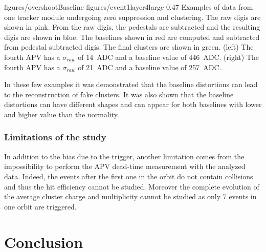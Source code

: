                  {figures/overshootBaseline} %
                 {figures/event1layer4large} %
                 {0.47}       %
                 { Examples of data from one tracker module undergoing zero suppression and clustering. The raw digis are shown in pink. From the raw digis, the pedestals are subtracted and the resulting digis are shown in blue. The baselines shown in red are computed and subtracted from pedestal subtracted digis. The final clusters are shown in green. (left) The fourth APV has a $\sigma_{raw}$ of 14~ADC and a baseline value of 446~ADC. (right)  The fourth APV has a $\sigma_{raw}$ of 21~ADC and a baseline value of 257~ADC.} %

In these few examples it was demonstrated that the baseline distortions can lead to the reconstruction of fake clusters. It was also shown that the baseline distortions can have different shapes and can appear for both baselines with lower and higher value than the normality.

\subsubsection{Limitations of the study}
 
In addition to the bias due to the trigger, another limitation comes from the impossibility to perform the APV dead-time measurement with the analyzed data. Indeed, the events after the first one in the orbit do not contain collisions and thus the hit efficiency cannot be studied. Moreover the complete evolution of the average cluster charge and multiplicity cannot be studied as only 7 events in one orbit are triggered. 


\section{Conclusion}

